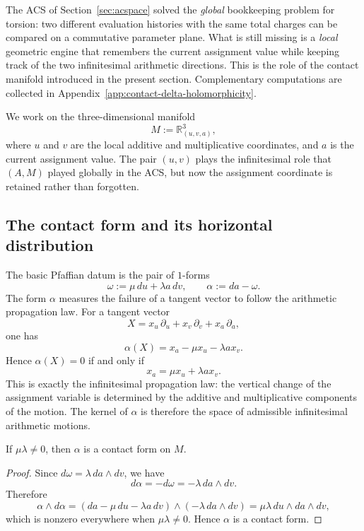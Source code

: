 The ACS of Section~\ref{sec:acspace} solved the \emph{global} bookkeeping problem for torsion: two different evaluation histories with the same total charges can be compared on a commutative parameter plane. What is still missing is a \emph{local} geometric engine that remembers the current assignment value while keeping track of the two infinitesimal arithmetic directions. This is the role of the contact manifold introduced in the present section. Complementary computations are collected in Appendix~\ref{app:contact-delta-holomorphicity}.

We work on the three-dimensional manifold
\[
    M:=\mathbb{R}^3_{(u,v,a)},
\]
where $u$ and $v$ are the local additive and multiplicative coordinates, and $a$ is the current assignment value. The pair $(u,v)$ plays the infinitesimal role that $(A,M)$ played globally in the ACS, but now the assignment coordinate is retained rather than forgotten.

\subsection{The contact form and its horizontal distribution}
\label{subsec:core_definitions}

The basic Pfaffian datum is the pair of $1$-forms
\begin{equation}\label{eq:contact_forms_def}
\omega:=\mu\,du+\lambda a\,dv,
\qquad
\alpha:=da-\omega.
\end{equation}
The form $\alpha$ measures the failure of a tangent vector to follow the arithmetic propagation law. For a tangent vector
\[
    X=x_u\,\partial_u+x_v\,\partial_v+x_a\,\partial_a,
\]
one has
\[
    \alpha(X)=x_a-\mu x_u-\lambda a x_v.
\]
Hence $\alpha(X)=0$ if and only if
\[
    x_a=\mu x_u+\lambda a x_v.
\]
This is exactly the infinitesimal propagation law: the vertical change of the assignment variable is determined by the additive and multiplicative components of the motion. The kernel of $\alpha$ is therefore the space of admissible infinitesimal arithmetic motions.

\begin{proposition}\label{prop:contact-form}
If $\mu\lambda\neq 0$, then $\alpha$ is a contact form on $M$.
\end{proposition}

\begin{proof}
Since $d\omega=\lambda\,da\wedge dv$, we have
\[
    d\alpha=-d\omega=-\lambda\,da\wedge dv.
\]
Therefore
\[
    \alpha\wedge d\alpha
    =(da-\mu\,du-\lambda a\,dv)\wedge(-\lambda\,da\wedge dv)
    =\mu\lambda\,du\wedge da\wedge dv,
\]
which is nonzero everywhere when $\mu\lambda\neq 0$. Hence $\alpha$ is a contact form.
\end{proof}

